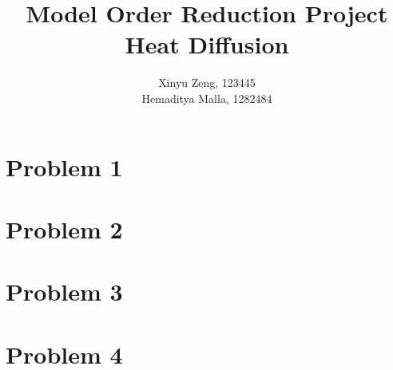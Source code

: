\documentclass[12pt]{article}
\begin{document}
 
 
\title{%
  Model Order Reduction Project \\
  \large Heat Diffusion} 
 
 \author{ %
Xinyu Zeng, 123445 \\
Hemaditya Malla, 1282484
}
 
\maketitle
\tableofcontents
\pagebreak

\section*{Problem 1}

\section*{Problem 2}
%
%
%

\section*{Problem 3}

\section*{Problem 4}
 

\pagebreak
\appendix
\end{document}
